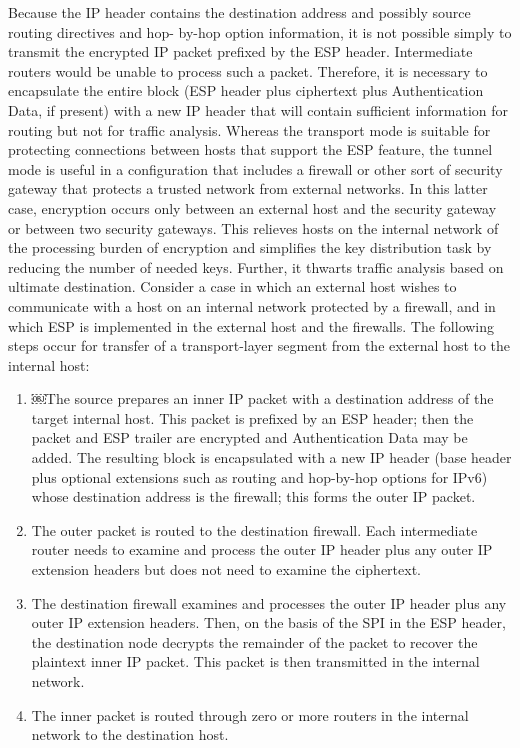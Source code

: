 \documentclass[12pt]{article}
\begin{document}
Because the IP header contains the destination address and possibly source routing directives and hop- by-hop option information, it is not possible simply to transmit the encrypted IP packet prefixed by the ESP header. Intermediate routers would be unable to process such a packet. Therefore, it is necessary to encapsulate the entire block (ESP header plus ciphertext plus Authentication Data, if present) with a new IP header that will contain sufficient information for routing but not for traffic analysis.
Whereas the transport mode is suitable for protecting connections between hosts that support the ESP feature, the tunnel mode is useful in a configuration that includes a firewall or other sort of security gateway that protects a trusted network from external networks. In this latter case, encryption occurs only between an external host and the security gateway or between two security gateways. This relieves hosts on the internal network of the processing burden of encryption and simplifies the key distribution task by reducing the number of needed keys. Further, it thwarts traffic analysis based on ultimate destination.
Consider a case in which an external host wishes to communicate with a host on an internal network protected by a firewall, and in which ESP is implemented in the external host and the firewalls. The following steps occur for transfer of a transport-layer segment from the external host to the internal host:
\begin{enumerate}
\item
￼The source prepares an inner IP packet with a destination address of the target internal host. This packet is prefixed by an ESP header; then the packet and ESP trailer are encrypted and Authentication Data may be added. The resulting block is encapsulated with a new IP header (base header plus optional extensions such as routing and hop-by-hop options for IPv6) whose destination address is the firewall; this forms the outer IP packet.
\item 
The outer packet is routed to the destination firewall. Each intermediate router needs to examine and process the outer IP header plus any outer IP extension headers but does not need to examine the ciphertext.
\item
The destination firewall examines and processes the outer IP header plus any outer IP extension headers. Then, on the basis of the SPI in the ESP header, the destination node decrypts the remainder of the packet to recover the plaintext inner IP packet. This packet is then transmitted in the internal network.
\item The inner packet is routed through zero or more routers in the internal network to the destination host.
\end{enumerate}
\end{document}
